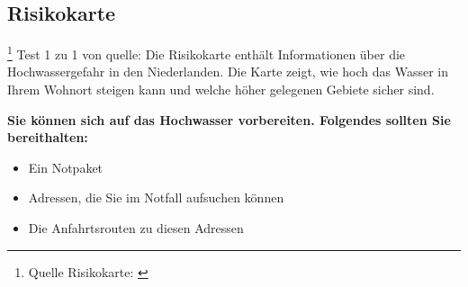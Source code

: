 \subsection{Risikokarte}\footnote{Quelle Risikokarte: \cite{risikokarte}} 
Test 1 zu 1 von quelle:
\newline\newline
\textnormal{Die Risikokarte enthält Informationen über die Hochwassergefahr in den Niederlanden. 
Die Karte zeigt, wie hoch das Wasser in Ihrem Wohnort steigen kann und welche höher gelegenen Gebiete sicher sind.
}

\textnormal{\newline\bfseries Sie können sich auf das Hochwasser vorbereiten. 
Folgendes sollten Sie bereithalten:}
 
\begin{itemize}  
\item Ein Notpaket
\item Adressen, die Sie im Notfall aufsuchen können
\item Die Anfahrtsrouten zu diesen Adressen
\end{itemize}  

